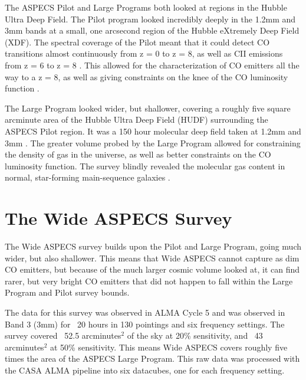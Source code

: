 The ASPECS Pilot and Large Programs both looked at regions in the Hubble Ultra Deep Field. The Pilot program looked incredibly deeply in the 1.2mm and 3mm bands at a small, one arcsecond region of the Hubble eXtremely Deep Field (XDF). The spectral coverage of the Pilot meant that it could detect CO transitions almost continuously from z = 0 to z = 8, as well as CII emissions from z = 6 to z = 8 \cite{walter2016alma}. This allowed for the characterization of CO emitters all the way to a z = 8, as well as giving constraints on the knee of the CO luminosity function \cite{walter2016alma}. 

The Large Program looked wider, but shallower, covering a roughly five square arcminute area of the Hubble Ultra Deep Field (HUDF) surrounding the ASPECS Pilot region. It was a 150 hour molecular deep field taken at 1.2mm and 3mm \cite{decarli2019alma}. The greater volume probed by the Large Program allowed for constraining the density of gas in the universe, as well as better constraints on the CO luminosity function. The survey blindly revealed the molecular gas content in normal, star-forming main-sequence galaxies \cite{decarli2019alma}. 

\section{The Wide ASPECS Survey}

The Wide ASPECS survey builds upon the Pilot and Large Program, going much wider, but also shallower. This means that Wide ASPECS cannot capture as dim CO emitters, but because of the much larger cosmic volume looked at, it can find rarer, but very bright CO emitters that did not happen to fall within the Large Program and Pilot survey bounds.

The data for this survey was observed in ALMA Cycle 5 and was observed in Band 3 (3mm) for ~20 hours in 130 pointings and six frequency settings. The survey covered ~52.5 arcminutes$^2$ of the sky at 20\% sensitivity, and ~43 arcminutes$^2$ at 50\% sensitivity. This means Wide ASPECS covers roughly five times the area of the ASPECS Large Program. This raw data was processed with the CASA ALMA pipeline into six datacubes, one for each frequency setting.


